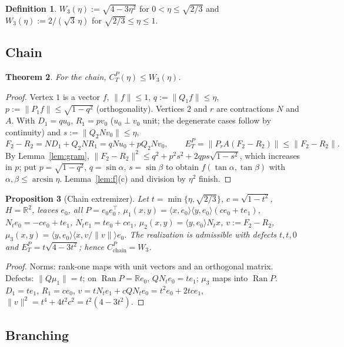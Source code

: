 \documentclass[11pt]{amsart}
\newtheorem{theorem}{Theorem}[section]
\newtheorem{proposition}[theorem]{Proposition}
\theoremstyle{definition}
\newtheorem{definition}[theorem]{Definition}
\newcommand{\R}{\mathbb{R}}
\newcommand{\Ran}{\operatorname{Ran}}
\newcommand{\norm}[1]{\lVert #1\rVert}
\newcommand{\ip}[2]{\langle #1,#2\rangle}
\begin{document}
\begin{definition}
$W_3(\eta):=\sqrt{4-3\eta^2}$ for $0<\eta\le\sqrt{2/3}$ and $W_3(\eta):=2/(\sqrt3\,\eta)$ for
$\sqrt{2/3}\le\eta\le1$.
\end{definition}

\subsection{Chain}

\begin{theorem}\label{thm:W3chain}
For the chain, $C^P_T(\eta)\le W_3(\eta)$.
\end{theorem}
\begin{proof}
Vertex $1$ is a vector $f$, $\norm f\le1$, $q:=\norm{Q_1f}\le\eta$, $p:=\norm{P_1f}\le\sqrt{1-q^2}$
(orthogonality). Vertices $2$ and $r$ are contractions $N$ and $A$. With
$D_1=qu_0$, $R_1=pv_0$ ($u_0\perp v_0$ unit; the degenerate cases follow by
continuity) and $s:=\norm{Q_2Nv_0}\le\eta$,
\[
F_2-R_2=N D_1+Q_2NR_1=qNu_0+pQ_2Nv_0 ,\qquad E_T^P=\norm{P_rA(F_2-R_2)}\le\norm{F_2-R_2}.
\]
By Lemma~\ref{lem:gram}, $\norm{F_2-R_2}^2\le q^2+p^2s^2+2qps\sqrt{1-s^2}$, which
increases in $p$; put $p=\sqrt{1-q^2}$, $q=\sin\alpha$, $s=\sin\beta$ to obtain $f(\tan\alpha,\tan\beta)$
with $\alpha,\beta\le\arcsin\eta$. Lemma~\ref{lem:f}(c) and division by $\eta^2$ finish.
\end{proof}

\begin{proposition}[Chain extremizer]\label{prop:chainext}
Let $t=\min\{\eta,\sqrt{2/3}\}$, $c=\sqrt{1-t^2}$, $H=\R^2$, leaves $e_0$, all
$P=e_0e_0^\top$, $\mu_1(x,y)=\ip x{e_0}\ip y{e_0}(ce_0+te_1)$, $N_te_0=-ce_0+te_1$,
$N_te_1=te_0+ce_1$, $\mu_2(x,y)=\ip y{e_0}N_tx$, $v:=F_2-R_2$,
$\mu_3(x,y)=\ip y{e_0}\ip x{v/\norm v}e_0$. The realization is admissible with
defects $t,t,0$ and $E^P_T=t\sqrt{4-3t^2}$; hence $C^P_{\mathrm{chain}}=W_3$.
\end{proposition}
\begin{proof}
Norms: rank-one maps with unit vectors and an orthogonal matrix. Defects:
$\norm{Q\mu_1}=t$; on $\Ran P=\R e_0$, $QN_te_0=te_1$; $\mu_3$ maps into $\Ran P$.
$D_1=te_1$, $R_1=ce_0$, $v=tN_te_1+cQN_te_0=t^2e_0+2tce_1$,
$\norm v^2=t^4+4t^2c^2=t^2(4-3t^2)$.
\end{proof}

\subsection{Branching}
\end{document}
